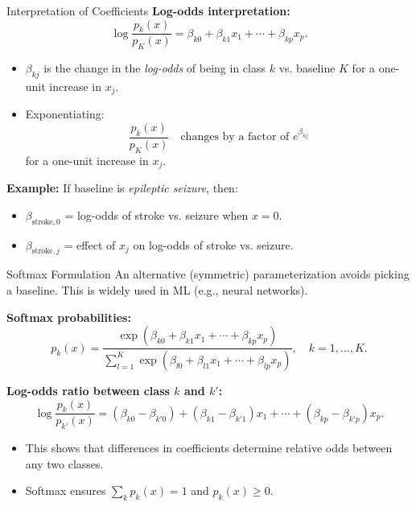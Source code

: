 \documentclass[../../main.tex]{subfiles}
\begin{document}
\begin{frame}{Interpretation of Coefficients}
\small
\textbf{Log-odds interpretation:}
\[
\log \frac{p_k(x)}{p_K(x)} = \beta_{k0} + \beta_{k1}x_1 + \cdots + \beta_{kp}x_p.
\]

\begin{itemize}
    \item $\beta_{kj}$ is the change in the \emph{log-odds} of being in class $k$ vs. baseline $K$ for a one-unit increase in $x_j$.
    \item Exponentiating:
    \[
    \frac{p_k(x)}{p_K(x)} \quad \text{changes by a factor of } e^{\beta_{kj}}
    \]
    for a one-unit increase in $x_j$.
\end{itemize}

\textbf{Example:}  
If baseline is \emph{epileptic seizure}, then:
\begin{itemize}
    \item $\beta_{\text{stroke},0}$ = log-odds of stroke vs. seizure when $x=0$.
    \item $\beta_{\text{stroke},j}$ = effect of $x_j$ on log-odds of stroke vs. seizure.
\end{itemize}
\end{frame}

\begin{frame}{Softmax Formulation}
\small
An alternative (symmetric) parameterization avoids picking a baseline.  
This is widely used in ML (e.g., neural networks).

\textbf{Softmax probabilities:}
\[
p_k(x) = \frac{\exp(\beta_{k0} + \beta_{k1}x_1 + \cdots + \beta_{kp}x_p)}
{\sum_{l=1}^{K} \exp(\beta_{l0} + \beta_{l1}x_1 + \cdots + \beta_{lp}x_p)},
\quad k=1,\dots,K.
\]

\textbf{Log-odds ratio between class $k$ and $k'$:}
\[
\log \frac{p_k(x)}{p_{k'}(x)} =
(\beta_{k0} - \beta_{k'0}) + (\beta_{k1}-\beta_{k'1})x_1 + \cdots + (\beta_{kp}-\beta_{k'p})x_p.
\]

\begin{itemize}
    \item This shows that differences in coefficients determine relative odds between any two classes.
    \item Softmax ensures $\sum_k p_k(x)=1$ and $p_k(x)\geq 0$.
\end{itemize}
\end{frame}
\end{document}
